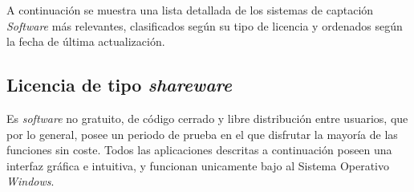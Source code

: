 A continuación se muestra una lista detallada de los sistemas de captación \emph{Software} más relevantes, clasificados según su tipo de licencia y ordenados según la fecha de última actualización.

\subsection{Licencia de tipo \emph{shareware}\cite{hui2008economics}}
Es \emph{software} no gratuito, de código cerrado y libre distribución entre usuarios, que por lo general, posee un periodo de prueba en el que disfrutar la mayoría de las funciones sin coste. Todos las aplicaciones descritas a continuación poseen una interfaz gráfica e intuitiva, y funcionan unicamente bajo al Sistema Operativo \emph{Windows\texttrademark}.

